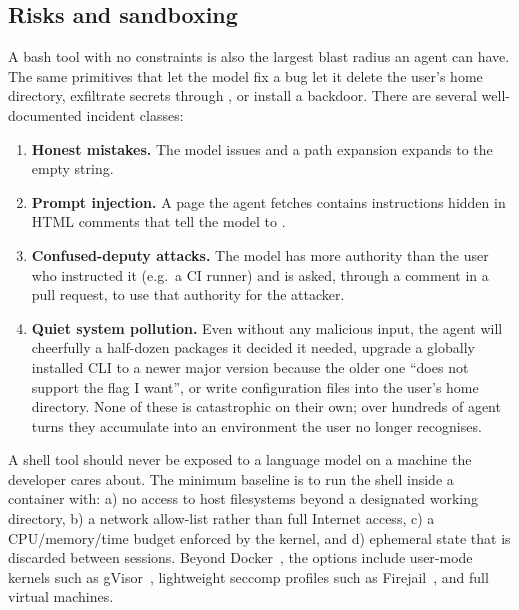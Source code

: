 \subsection{Risks and sandboxing}
\label{sec:sandbox}

A bash tool with no constraints is also the largest blast radius an
agent can have. The same primitives that let the model fix a bug let
it delete the user's home directory, exfiltrate secrets through
, or install a backdoor. There are several well-documented
incident classes:

\begin{enumerate}[label=(\arabic*)]
\item \textbf{Honest mistakes.} The model issues
   and a path expansion expands  to
  the empty string.
\item \textbf{Prompt injection.} A page the agent fetches contains
  instructions hidden in HTML comments that tell the model to
  .
\item \textbf{Confused-deputy attacks.} The model has more authority
  than the user who instructed it (e.g.\ a CI runner) and is asked,
  through a comment in a pull request, to use that authority for
  the attacker.
\item \textbf{Quiet system pollution.} Even without any malicious
  input, the agent will cheerfully  a half-dozen
  packages it decided it needed, upgrade a globally installed CLI to
  a newer major version because the older one ``does not support
  the flag I want'', or write configuration files into the user's
  home directory. None of these is catastrophic on their own; over
  hundreds of agent turns they accumulate into an environment the
  user no longer recognises.
\end{enumerate}

\begin{warningbox}
\small
A shell tool should never be exposed to a language model on a
machine the developer cares about. The minimum baseline is to run
the shell inside a container with: a) no access to host
filesystems beyond a designated working directory, b) a network
allow-list rather than full Internet access, c) a CPU/memory/time
budget enforced by the kernel, and d) ephemeral state that is
discarded between sessions. Beyond Docker~\citep{docker2013}, the
options include user-mode kernels such as
gVisor~\citep{gvisor2018}, lightweight seccomp profiles such as
Firejail~\citep{firejail}, and full virtual machines.
\end{warningbox}

